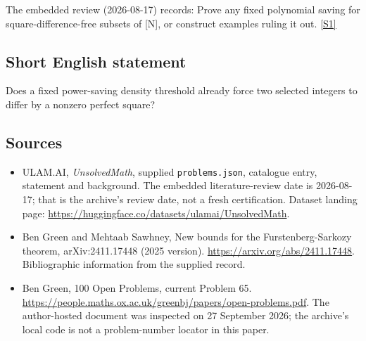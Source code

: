 \documentclass[11pt,a4paper]{article}
\newcommand{\sref}[2]{\hyperlink{source:#1:#2}{[S#2]}}
\begin{document}
The embedded review (2026-08-17) records: Prove any fixed polynomial saving for square-difference-free subsets of [N], or construct examples ruling it out. \sref{statement}{1}

\subsection{Short English statement}

Does a fixed power-saving density threshold already force two selected integers to differ by a nonzero perfect square?

\subsection{Sources}

{\small

\begin{itemize}

\item[\hypertarget{source:statement:1}{S1}] ULAM.AI, \emph{UnsolvedMath}, supplied \texttt{problems.json}, catalogue entry, statement and background. The embedded literature-review date is 2026-08-17; that is the archive’s review date, not a fresh certification. Dataset landing page: \url{https://huggingface.co/datasets/ulamai/UnsolvedMath}.

\item[\hypertarget{source:statement:2}{S2}] Ben Green and Mehtaab Sawhney, New bounds for the Furstenberg-Sarkozy theorem, arXiv:2411.17448 (2025 version). \url{https://arxiv.org/abs/2411.17448}. Bibliographic information from the supplied record.

\item[\hypertarget{source:statement:3}{S3}] Ben Green, 100 Open Problems, current Problem 65. \url{https://people.maths.ox.ac.uk/greenbj/papers/open-problems.pdf}. The author-hosted document was inspected on 27 September 2026; the archive’s local code is not a problem-number locator in this paper.

\end{itemize}

}

\label{end:statement}
\end{document}
